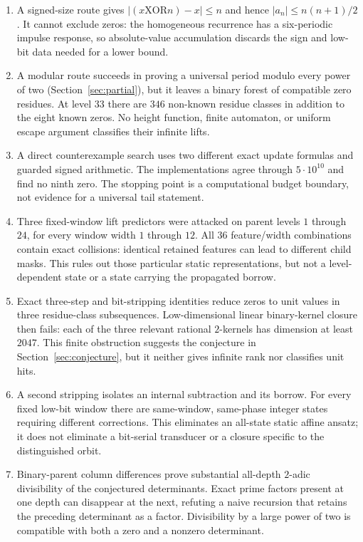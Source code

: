 \documentclass[11pt]{amsart}
\theoremstyle{definition}
\begin{document}
\begin{enumerate}
\item A signed-size route gives
\(
 |(x\mathbin{\mathrm{XOR}}n)-x|\leq n
\)
and hence $|a_n|\leq n(n+1)/2$.  It cannot exclude zeros: the homogeneous
recurrence has a six-periodic impulse response, so absolute-value
accumulation discards the sign and low-bit data needed for a lower bound.

\item A modular route succeeds in proving a universal period modulo every
power of two (Section~\ref{sec:partial}), but it leaves a binary forest of
compatible zero residues.  At level $33$ there are $346$ non-known residue
classes in addition to the eight known zeros.  No height function, finite
automaton, or uniform escape argument classifies their infinite lifts.

\item A direct counterexample search uses two different exact update formulas
and guarded signed arithmetic.  The implementations agree through
$5\cdot10^{10}$ and find no ninth zero.  The stopping point is a computational
budget boundary, not evidence for a universal tail statement.

\item Three fixed-window lift predictors were attacked on parent levels
$1$ through $24$, for every window width $1$ through $12$.  All $36$
feature/width combinations contain exact collisions: identical retained
features can lead to different child masks.  This rules out those particular
static representations, but not a level-dependent state or a state carrying
the propagated borrow.

\item Exact three-step and bit-stripping identities reduce zeros to unit
values in three residue-class subsequences.  Low-dimensional linear
binary-kernel closure then fails: each of the three relevant rational
$2$-kernels has dimension at least $2047$.  This finite obstruction suggests
the conjecture in Section~\ref{sec:conjecture}, but it neither gives infinite
rank nor classifies unit hits.

\item A second stripping isolates an internal subtraction and its borrow.
For every fixed low-bit window there are same-window, same-phase integer
states requiring different corrections.  This eliminates an all-state static
affine ansatz; it does not eliminate a bit-serial transducer or a closure
specific to the distinguished orbit.

\item Binary-parent column differences prove substantial all-depth
$2$-adic divisibility of the conjectured determinants.  Exact prime factors
present at one depth can disappear at the next, refuting a naive recursion
that retains the preceding determinant as a factor.  Divisibility by a large
power of two is compatible with both a zero and a nonzero determinant.
\end{enumerate}
\end{document}
